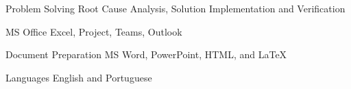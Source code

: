 


\begin{cvskills}


\cvskill
{Problem Solving} %
{Root Cause Analysis, Solution Implementation and Verification} %


\cvskill
{MS Office} %
{Excel, Project, Teams, Outlook} %


\cvskill
{Document Preparation} %
{MS Word, PowerPoint, HTML, and LaTeX } %


\cvskill
{Languages} %
{English and Portuguese} %


\end{cvskills}
